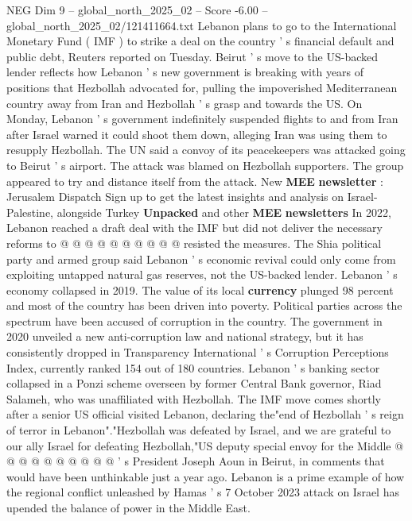 \begin{textsample}{NEG Dim 9 – global\_north\_2025\_02 – Score -6.00 – global\_north\_2025\_02/121411664.txt}  \label{ex:f9_neg_008}
Lebanon plans to go to the International Monetary Fund ( IMF ) to strike a deal on the country ' s financial default and public debt, Reuters reported on Tuesday.
Beirut ' s move to the US-backed lender reflects how Lebanon ' s new government is breaking with years of positions that Hezbollah advocated for, pulling the impoverished Mediterranean country away from Iran and Hezbollah ' s grasp and towards the US.
On Monday, Lebanon ' s government indefinitely suspended flights to and from Iran after Israel warned it could shoot them down, alleging Iran was using them to resupply Hezbollah.
The UN said a convoy of its peacekeepers was attacked going to Beirut ' s airport.
The attack was blamed on Hezbollah supporters.
The group appeared to try and distance itself from the attack.
New \textbf{MEE} \textbf{newsletter} : Jerusalem Dispatch Sign up to get the latest insights and analysis on Israel-Palestine, alongside Turkey \textbf{Unpacked} and other \textbf{MEE} \textbf{newsletters} In 2022, Lebanon reached a draft deal with the IMF but did not deliver the necessary reforms to @ @ @ @ @ @ @ @ @ @ resisted the measures.
The Shia political party and armed group said Lebanon ' s economic revival could only come from exploiting untapped natural gas reserves, not the US-backed lender.
Lebanon ' s economy collapsed in 2019.
The value of its local \textbf{currency} plunged 98 percent and most of the country has been driven into poverty.
Political parties across the spectrum have been accused of corruption in the country.
The government in 2020 unveiled a new anti-corruption law and national strategy, but it has consistently dropped in Transparency International ' s Corruption Perceptions Index, currently ranked 154 out of 180 countries.
Lebanon ' s banking sector collapsed in a Ponzi scheme overseen by former Central Bank governor, Riad Salameh, who was unaffiliated with Hezbollah.
The IMF move comes shortly after a senior US official visited Lebanon, declaring the"end of Hezbollah ' s reign of terror in Lebanon"."Hezbollah was defeated by Israel, and we are grateful to our ally Israel for defeating Hezbollah,"US deputy special envoy for the Middle @ @ @ @ @ @ @ @ @ @ ' s President Joseph Aoun in Beirut, in comments that would have been unthinkable just a year ago.
Lebanon is a prime example of how the regional conflict unleashed by Hamas ' s 7 October 2023 attack on Israel has upended the balance of power in the Middle East.

\end{textsample}
